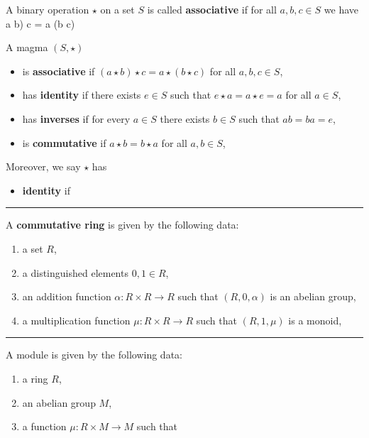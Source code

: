 \documentclass[12pt]{article}
\newcommand{\keyword}[1]{\textbf{#1}}
\def\[#1\]{\begin{align*}#1\end{align*}}
\newcommand{\sepline}{\rule{\textwidth}{0.4pt}}
\newenvironment{cd}{\begin{center}\begin{tikzcd}}{\end{tikzcd}\end{center}}
\theoremstyle{definition}
\newcommand{\<}{\left\langle}
\renewcommand{\>}{\right\rangle}
\DeclareMathOperator{\id}{id}
\begin{document}
A binary operation $\star$ on a set $S$ is called \keyword{associative} if
for all $a, b, c \in S$ we have
\[
    (a \star b) \star c = a \star (b \star c)
\]

A magma $(S, \star)$
\begin{itemize}
    \item is \keyword{associative} if $(a \star b) \star c = a \star (b \star c)$ for all $a, b, c \in S$,
    \item has \keyword{identity} if there exists $e \in S$ such that $e \star a = a \star e = a$ for all $a \in S$,
    \item has \keyword{inverses} if for every $a \in S$ there exists $b \in S$ such that $ab = ba = e$,
    \item is \keyword{commutative} if $a \star b = b \star a$ for all $a, b \in S$,
\end{itemize}
Moreover, we say $\star$ has
\begin{itemize}
    \item \keyword{identity} if 
\end{itemize}


\sepline

A \keyword{commutative ring} is given by the following data:
\begin{enumerate}[(1)]
    \item a set $R$,
    \item a distinguished elements $0, 1 \in R$,
    \item an addition function $\alpha : R \times R \to R$ such that $(R, 0, \alpha)$ is an abelian group,
    \item a multiplication function $\mu : R \times R \to R$ such that $(R, 1, \mu)$ is a monoid,
\end{enumerate}

\sepline

A \keyword{}{module} is given by the following data:
\begin{enumerate}[(1)]
    \item a ring $R$,
    \item an abelian group $M$,
    \item a function $\mu : R \times M \to M$ such that
\end{enumerate} 
\end{document}
